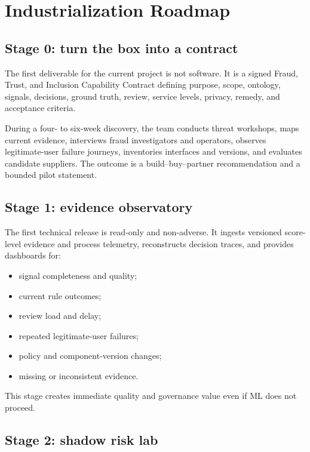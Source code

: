 \chapter{Industrialization Roadmap}

\section{Stage 0: turn the box into a contract}

The first deliverable for the current project is not software. It is a signed Fraud, Trust, and Inclusion Capability Contract defining purpose, scope, ontology, signals, decisions, ground truth, review, service levels, privacy, remedy, and acceptance criteria.

During a four- to six-week discovery, the team conducts threat workshops, maps current evidence, interviews fraud investigators and operators, observes legitimate-user failure journeys, inventories interfaces and versions, and evaluates candidate suppliers. The outcome is a build--buy--partner recommendation and a bounded pilot statement.

\section{Stage 1: evidence observatory}

The first technical release is read-only and non-adverse. It ingests versioned score-level evidence and process telemetry, reconstructs decision traces, and provides dashboards for:

\begin{itemize}
\item signal completeness and quality;
\item current rule outcomes;
\item review load and delay;
\item repeated legitimate-user failures;
\item policy and component-version changes;
\item missing or inconsistent evidence.
\end{itemize}

This stage creates immediate quality and governance value even if ML does not proceed.

\section{Stage 2: shadow risk lab}

